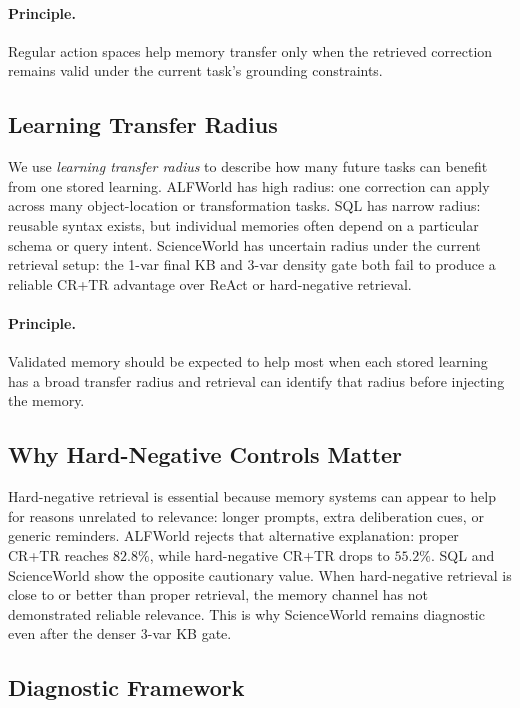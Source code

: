 \paragraph{Principle.}
Regular action spaces help memory transfer only when the retrieved correction remains valid under the current task's grounding constraints.

\subsection{Learning Transfer Radius}
\label{sec:transfer-radius}

We use \emph{learning transfer radius} to describe how many future tasks can benefit from one stored learning.
ALFWorld has high radius: one correction can apply across many object-location or transformation tasks.
SQL has narrow radius: reusable syntax exists, but individual memories often depend on a particular schema or query intent.
ScienceWorld has uncertain radius under the current retrieval setup: the 1-var final KB and 3-var density gate both fail to produce a reliable CR+TR advantage over ReAct or hard-negative retrieval.

\paragraph{Principle.}
Validated memory should be expected to help most when each stored learning has a broad transfer radius and retrieval can identify that radius before injecting the memory.

\subsection{Why Hard-Negative Controls Matter}
\label{sec:hard-negative-analysis}

Hard-negative retrieval is essential because memory systems can appear to help for reasons unrelated to relevance: longer prompts, extra deliberation cues, or generic reminders.
ALFWorld rejects that alternative explanation: proper CR+TR reaches $82.8\%$, while hard-negative CR+TR drops to $55.2\%$.
SQL and ScienceWorld show the opposite cautionary value.
When hard-negative retrieval is close to or better than proper retrieval, the memory channel has not demonstrated reliable relevance.
This is why ScienceWorld remains diagnostic even after the denser 3-var KB gate.

\subsection{Diagnostic Framework}
\label{sec:framework}

